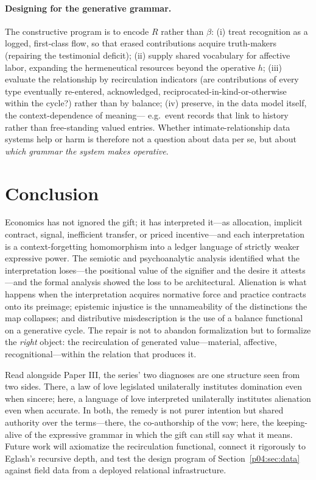\documentclass[11pt,a4paper]{article}
\begin{document}
\paragraph{Designing for the generative grammar.}
The constructive program is to encode $R$ rather than $\beta$:
(i) treat recognition as a logged, first-class flow, so that erased
contributions acquire truth-makers (repairing the testimonial deficit);
(ii) supply shared vocabulary for affective labor, expanding the
hermeneutical resources beyond the operative $h$;
(iii) evaluate the relationship by recirculation indicators (are
contributions of every type eventually re-entered, acknowledged,
reciprocated-in-kind-or-otherwise within the cycle?) rather than by balance;
(iv) preserve, in the data model itself, the context-dependence of meaning---
e.g.\ event records that link to history rather than free-standing valued
entries. Whether intimate-relationship data systems help or harm is therefore
not a question about data per se, but about \emph{which grammar the system
makes operative}.

\section{Conclusion}
\label{p04:sec:conclusion}

Economics has not ignored the gift; it has interpreted it---as allocation,
implicit contract, signal, inefficient transfer, or priced incentive---and
each interpretation is a context-forgetting homomorphism into a ledger
language of strictly weaker expressive power. The semiotic and
psychoanalytic analysis identified what the interpretation loses---the
positional value of the signifier and the desire it attests---and the formal
analysis showed the loss to be architectural. Alienation is what happens when
the interpretation acquires normative force and practice contracts onto its
preimage; epistemic injustice is the unnameability of the distinctions the
map collapses; and distributive misdescription is the use of a balance
functional on a generative cycle. The repair is not to abandon formalization
but to formalize the \emph{right} object: the recirculation of generated
value---material, affective, recognitional---within the relation that
produces it.

Read alongside Paper III, the series' two diagnoses are one structure seen
from two sides. There, a law of love legislated unilaterally institutes
domination even when sincere; here, a language of love interpreted
unilaterally institutes alienation even when accurate. In both, the remedy is
not purer intention but shared authority over the terms---there, the
co-authorship of the vow; here, the keeping-alive of the expressive grammar
in which the gift can still say what it means. Future work will axiomatize
the recirculation functional, connect it rigorously to Eglash's recursive
depth, and test the design program of Section~\ref{p04:sec:data} against field
data from a deployed relational infrastructure.
\end{document}
